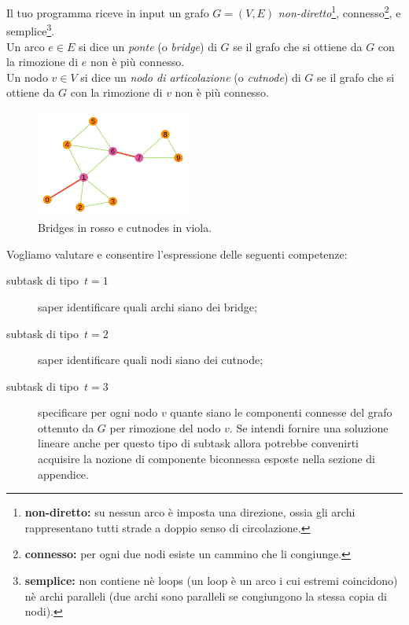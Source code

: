 \renewcommand{\nomebreve}{bridges\_and\_cutnodes}
\renewcommand{\titolo}{Ponti e nodi di articolazione in grafi non diretti}

\introduzione{}

\noindent
Il tuo programma riceve in input un grafo  $G=(V,E)$ \emph{non-diretto}\footnote{{\bf non-diretto:} su nessun arco è imposta una direzione, ossia gli archi rappresentano tutti strade a doppio senso di circolazione.}, connesso\footnote{{\bf connesso:} per ogni due nodi esiste un cammino che li congiunge.}, e semplice\footnote{{\bf semplice:} non contiene nè loops (un loop è un arco i cui estremi coincidono) nè archi paralleli (due archi sono paralleli se congiungono la stessa copia di nodi).}.\\
\indent
Un arco $e\in E$ si dice un \emph{ponte} (o \emph{bridge}) di $G$ se il grafo che si ottiene da $G$ con la rimozione di $e$ non è più connesso.\\
\indent
Un nodo $v\in V$ si dice un \emph{nodo di articolazione} (o \emph{cutnode}) di $G$ se il grafo che si ottiene da $G$ con la rimozione di $v$ non è più connesso.


\begin{figure}[h!]
\begin{center}
  \noindent \includegraphics[width=0.45\textwidth]{figures/bridges_and_cutnodes.png}
\end{center}
\caption{Bridges in rosso e cutnodes in viola.}
\end{figure}


Vogliamo valutare e consentire l'espressione delle seguenti competenze:
\begin{description}
\item[subtask di tipo~$t=1$] saper identificare quali archi siano dei bridge;
\item[subtask di tipo~$t=2$] saper identificare quali nodi siano dei cutnode;
\item[subtask di tipo~$t=3$] specificare per ogni nodo $v$ quante siano le componenti connesse del grafo ottenuto da $G$ per rimozione del nodo $v$. Se intendi fornire una soluzione lineare anche per questo tipo di subtask allora potrebbe convenirti acquisire la nozione di componente biconnessa esposte nella sezione di appendice. 
\end{description}


